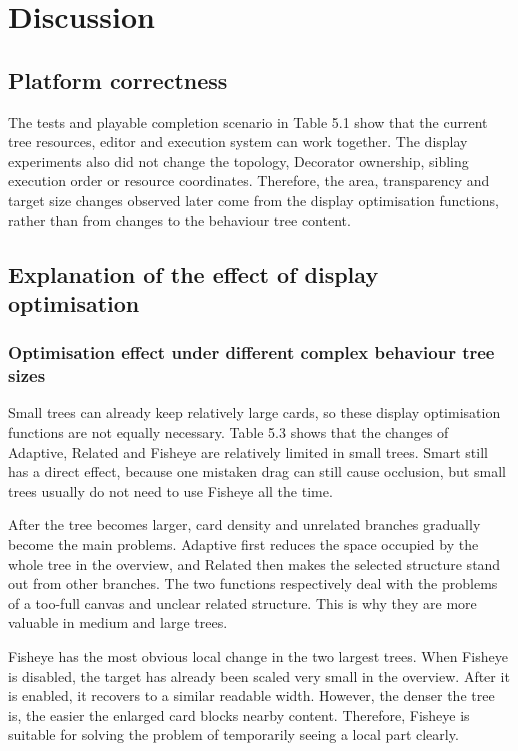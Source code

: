\chapter{Discussion}

\section{Platform correctness}

The tests and playable completion scenario in Table 5.1 show that the current tree resources, editor and execution system can work together. The display experiments also did not change the topology, Decorator ownership, sibling execution order or resource coordinates. Therefore, the area, transparency and target size changes observed later come from the display optimisation functions, rather than from changes to the behaviour tree content.

\section{Explanation of the effect of display optimisation}

\subsection{Optimisation effect under different complex behaviour tree sizes}

Small trees can already keep relatively large cards, so these display optimisation functions are not equally necessary. Table 5.3 shows that the changes of Adaptive, Related and Fisheye are relatively limited in small trees. Smart still has a direct effect, because one mistaken drag can still cause occlusion, but small trees usually do not need to use Fisheye all the time.

After the tree becomes larger, card density and unrelated branches gradually become the main problems. Adaptive first reduces the space occupied by the whole tree in the overview, and Related then makes the selected structure stand out from other branches. The two functions respectively deal with the problems of a too-full canvas and unclear related structure. This is why they are more valuable in medium and large trees.

Fisheye has the most obvious local change in the two largest trees. When Fisheye is disabled, the target has already been scaled very small in the overview. After it is enabled, it recovers to a similar readable width. However, the denser the tree is, the easier the enlarged card blocks nearby content. Therefore, Fisheye is suitable for solving the problem of temporarily seeing a local part clearly.

